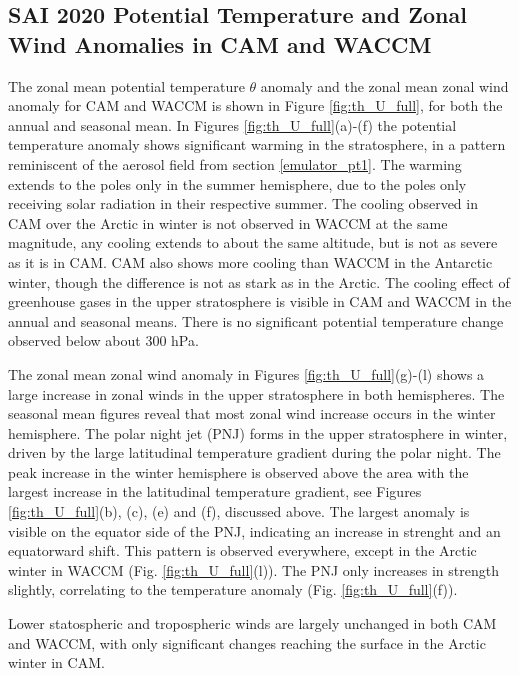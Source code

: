 \subsection{SAI 2020 Potential Temperature and Zonal Wind Anomalies in CAM and WACCM}
The zonal mean potential temperature $\theta$ anomaly and the zonal mean zonal wind anomaly for CAM and WACCM is shown in Figure \ref{fig:th_U_full}, for both the annual and seasonal mean. 
In Figures \ref{fig:th_U_full}(a)-(f) the potential temperature anomaly shows significant warming in the stratosphere, in a pattern reminiscent of the aerosol field from section \ref{emulator_pt1}. The warming extends to the poles only in the summer hemisphere, due to the poles only receiving solar radiation in their respective summer. The cooling observed in CAM over the Arctic in winter is not observed in WACCM at the same magnitude, any cooling extends to about the same altitude, but is not as severe as it is in CAM. CAM also shows more cooling than WACCM in the Antarctic winter, though the difference is not as stark as in the Arctic. The cooling effect of greenhouse gases in the upper stratosphere is visible in CAM and WACCM in the annual and seasonal means. There is no significant potential temperature change observed below about 300 hPa. 

The zonal mean zonal wind anomaly in Figures \ref{fig:th_U_full}(g)-(l) shows a large increase in zonal winds in the upper stratosphere in both hemispheres. The seasonal mean figures reveal that most zonal wind increase occurs in the winter hemisphere. The polar night jet (PNJ) forms in the upper stratosphere in winter, driven by the large latitudinal temperature gradient during the polar night. The peak increase in the winter hemisphere is observed above the area with the largest increase in the latitudinal temperature gradient, see Figures \ref{fig:th_U_full}(b), (c), (e) and (f), discussed above. The largest anomaly is visible on the equator side of the PNJ, indicating an increase in strenght and an equatorward shift. This pattern is observed everywhere, except in the Arctic winter in WACCM (Fig. \ref{fig:th_U_full}(l)). The PNJ only increases in strength slightly, correlating to the temperature anomaly (Fig. \ref{fig:th_U_full}(f)). 

Lower statospheric and tropospheric winds are largely unchanged in both CAM and WACCM, with only significant changes reaching the surface in the Arctic winter in CAM. 

